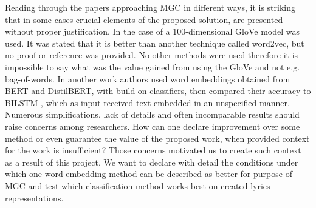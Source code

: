Reading through the papers approaching MGC in different ways, it is striking that in some cases crucial elements of the proposed solution, are presented without proper justification. In the case of \cite{sig_emb} a 100-dimensional GloVe model was used. It was stated that it is better than another technique called word2vec, but no proof or reference was provided. No other methods were used therefore it is impossible to say what was the value gained from using the GloVe and not e.g. bag-of-words.  In another work \cite{sig_bert} authors used word embeddings obtained from BERT and DistilBERT, with build-on classifiers, then compared their accuracy to BILSTM \cite{bilstm}, which as input received text embedded in an unspecified manner. Numerous simplifications, lack of details and often incomparable results should raise concerns among researchers. How can one declare improvement over some method or even guarantee the value of the proposed work, when provided context for the work is insufficient? Those concerns motivated us to create such context as a result of this project. We want to declare with detail the conditions under which one word embedding method can be described as better for purpose of MGC and test which classification method works best on created lyrics representations. 

